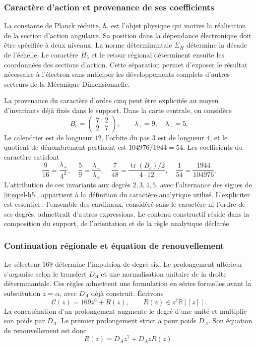 \subsubsection{Caractère d'action et provenance de ses coefficients}
\label{ii:sec:revision-planck}

La constante de Planck réduite, \(\hbar\), est l'objet physique qui
motive la réalisation de la section d'action angulaire. Sa position dans
la dépendance électronique doit être spécifiée à deux niveaux. La norme
déterminantale \(\Sigma_H\) détermine la décade de l'échelle. Le caractère
\(H_5\) et le retour régional déterminent ensuite les coordonnées des
sections d'action. Cette séparation permet d'exposer le résultat
nécessaire à l'électron sans anticiper les développements complets
d'autres secteurs de la Mécanique Dimensionnelle.

La provenance du caractère d'ordre cinq peut être explicitée au moyen
d'invariants déjà fixés dans le support. Dans la carte centrale, on considère
\[
 B_c=\begin{pmatrix}7&2\\2&7\end{pmatrix},
 \qquad \lambda_+=9,\quad\lambda_-=5.
\]
Le calendrier est de longueur \(12\), l'orbite du pas \(3\) est de
longueur \(4\), et le quotient de dénombrement pertinent est
\(104976/1944=54\). Les coefficients du caractère satisfont
\begin{equation}
 \frac9{16}=\frac{\lambda_+}{4^2},\quad
 \frac59=\frac{\lambda_-}{\lambda_+},\quad
 \frac7{48}=\frac{\operatorname{tr}(B_c)/2}{4\cdot12},\quad
 \frac1{54}=\frac{1944}{104976}.
 \label{ii:eq:revision-h5-coeficientes}
\end{equation}
L'attribution de ces invariants aux degrés \(2,3,4,5\), avec
l'alternance des signes de \eqref{ii:eq:el-h5}, appartient à la définition du
caractère analytique utilisé. L'expliciter est essentiel : l'ensemble des
cardinaux, considéré sans le caractère ni l'ordre de ses degrés,
admettrait d'autres expressions. Le contenu constructif réside dans la
composition du support, de l'orientation et de la règle analytique déclarée.

\subsubsection{Continuation régionale et équation de renouvellement}

Le sélecteur \(169\) détermine l'impulsion de degré six. Le prolongement
ultérieur s'organise selon le transfert \(D_A\) et une normalisation
unitaire de la droite déterminantale. Ces règles admettent une formulation
en séries formelles avant la substitution \(z=\alpha\), avec \(D_A\) déjà
construit. Écrivons
\[
 \mathscr C(z)=169z^6+R(z),\qquad R(z)\in z^7\mathbb R[[z]].
\]
La concaténation d'un prolongement augmente le degré d'une unité et
multiplie son poids par \(D_A\). Le premier prolongement strict a pour
poids \(D_A\). Son équation de renouvellement est donc
\begin{equation}
 R(z)=D_Az^7+D_AzR(z).
 \label{ii:eq:revision-renovacion}
\end{equation}

